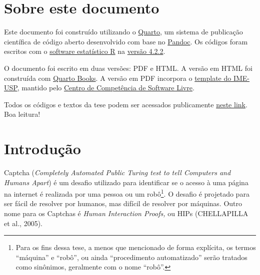 \documentclass[12pt,twoside,brazilian]{book}
\begin{document}

\mainmatter

\pagestyle{mainmatter}

\singlespacing


\hypertarget{sobre-este-documento}{%
\chapter*{Sobre este documento}\label{sobre-este-documento}}


Este documento foi construído utilizando o
\href{https://quarto.org/}{Quarto}, um sistema de publicação científica
de código aberto desenvolvido com base no
\href{https://pandoc.org/}{Pandoc}. Os códigos foram escritos com o
\href{https://cran.r-project.org/}{software estatístico R} na
\href{https://cran.r-project.org/bin/windows/base/}{versão 4.2.2}.

O documento foi escrito em duas versões: PDF e HTML. A versão em HTML
foi construída com \href{https://quarto.org/docs/books/}{Quarto Books}.
A versão em PDF incorpora o
\href{https://gitlab.com/ccsl-usp/modelo-latex}{template do IME-USP},
mantido pelo \href{https://ccsl.ime.usp.br/}{Centro de Competência de
Software Livre}.

Todos os códigos e textos da tese podem ser acessados publicamente
\href{https://github.com/jtrecenti/doutorado}{neste link}. Boa leitura!


\hypertarget{sec-introducao}{%
\chapter{Introdução}\label{sec-introducao}}


Captcha (\emph{Completely Automated Public Turing test to tell Computers
and Humans Apart}) é um desafio utilizado para identificar se o acesso à
uma página na internet é realizada por uma pessoa ou um robô\footnote{Para
  os fins dessa tese, a menos que mencionado de forma explícita, os
  termos ``máquina'' e ``robô'', ou ainda ``procedimento automatizado''
  serão tratados como sinônimos, geralmente com o nome ``robô''.}. O
desafio é projetado para ser fácil de resolver por humanos, mas difícil
de resolver por máquinas. Outro nome para os Captchas é \emph{Human
Interaction Proofs,} ou HIPs (CHELLAPILLA et al., 2005).
\end{document}
